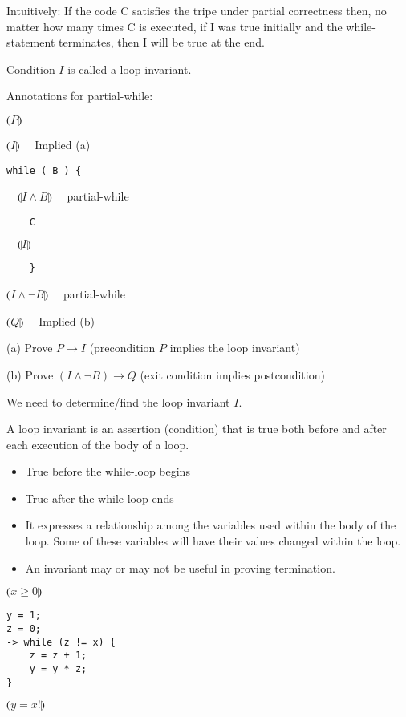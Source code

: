 \documentclass{article}
\begin{document}
Intuitively: If the code C satisfies the tripe under partial correctness then, no matter how many times C is executed, if I was true initially and the while-statement terminates, then I will be true at the end.

Condition $I$ is called a loop invariant.

Annotations for partial-while:

$\llparenthesis P \rrparenthesis$

$\llparenthesis I \rrparenthesis \quad$ Implied (a)

\begin{verbatim}
while ( B ) {
\end{verbatim}
$\quad \llparenthesis I \wedge B \rrparenthesis \quad$ partial-while

\begin{verbatim}
    C
\end{verbatim}

$\quad \llparenthesis I \rrparenthesis$

\begin{verbatim}
    }
\end{verbatim}

$\llparenthesis I \wedge \neg B \rrparenthesis \quad $ partial-while

$\llparenthesis Q \rrparenthesis \quad$ Implied (b)

(a) Prove $P \to I$ (precondition $P$ implies the loop invariant)

(b) Prove $(I \wedge \neg B) \to Q$ (exit condition implies postcondition)

We need to determine/find the loop invariant $I$. 

A loop invariant is an assertion (condition) that is true both before and after each execution of the body of a loop.
\begin{itemize}
    \item True before the while-loop begins
    \item True after the while-loop ends
    \item It expresses a relationship among the variables used within the body of the loop. Some of these variables will have their values changed within the loop.
    \item An invariant may or may not be useful in proving termination.
\end{itemize}

$\llparenthesis x \ge 0 \rrparenthesis$
\begin{verbatim}
y = 1;
z = 0;
-> while (z != x) {
    z = z + 1;
    y = y * z;
}
\end{verbatim}
$\llparenthesis y = x! \rrparenthesis$
\end{document}
